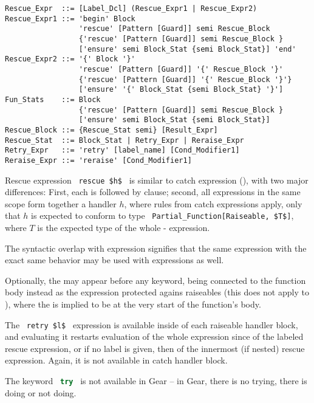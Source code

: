 \syntax\begin{lstlisting}
Rescue_Expr  ::= [Label_Dcl] (Rescue_Expr1 | Rescue_Expr2)
Rescue_Expr1 ::= 'begin' Block 
                 'rescue' [Pattern [Guard]] semi Rescue_Block
                 {'rescue' [Pattern [Guard]] semi Rescue_Block }
                 ['ensure' semi Block_Stat {semi Block_Stat}] 'end'
Rescue_Expr2 ::= '{' Block '}' 
                 'rescue' [Pattern [Guard]] '{' Rescue_Block '}'
                 {'rescue' [Pattern [Guard]] '{' Rescue_Block '}'}
                 ['ensure' '{' Block_Stat {semi Block_Stat} '}']
Fun_Stats    ::= Block
                 {'rescue' [Pattern [Guard]] semi Rescue_Block }
                 ['ensure' semi Block_Stat {semi Block_Stat}]
Rescue_Block ::= {Rescue_Stat semi} [Result_Expr]
Rescue_Stat  ::= Block_Stat | Retry_Expr | Reraise_Expr
Retry_Expr   ::= 'retry' [label_name] [Cond_Modifier1]
Reraise_Expr ::= 'reraise' [Cond_Modifier1]
\end{lstlisting}

Rescue expression ~\lstinline!rescue $h$!~ is similar to catch expression (), with two major differences: First, each  is followed by  clause; second, all  expressions in the same scope form together a handler $h$, where rules from catch expressions apply, only that $h$ is expected to conform to type ~\lstinline!Partial_Function[Raiseable, $T$]!, where $T$ is the expected type of the whole - expression. 

The syntactic overlap with  expression signifies that the same expression with the exact same behavior may be used with  expressions as well. 

Optionally, the  may appear before any  keyword, being connected to the function body instead as the expression protected agains raiseables (this does not apply to ), where the  is implied to be at the very start of the function's body. 

The ~\lstinline!retry $l$!~ expression is available inside of each raiseable handler block, and evaluating it restarts evaluation of the whole expression since  of the labeled rescue expression, or if no label is given, then of the innermost (if nested) rescue expression. Again, it is not available in catch handler block. 

The keyword ~\lstinline[language=Java]!try!~ is not available in Gear -- in Gear, there is no trying, there is doing or not doing.  






